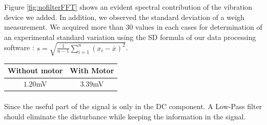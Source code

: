 \documentclass{article}[12pt]
\begin{document}
Figure \ref{fig:nofilterFFT} shows an evident spectral contribution of the vibration device we added. In addition, we observed the standard deviation of a weigh measurement. We acquired more than 30 values in each cases for determination of an experimental standard variation using the SD formula of our data processing software : $s = \sqrt{\frac{1}{n-1} \sum_{i=1}^n (x_i - \overline{x})^2}$. \\
\begin{center}
\begin{tabular}{|c|c|}
    \hline
    Without motor & With Motor \\
    \hline
     $1.20$mV & $3.39$mV \\
    \hline
\end{tabular}
\end{center}
\paragraph{}
Since the useful part of the signal is only in the DC component. A Low-Pass filter should eliminate the disturbance while keeping the information in the signal.
\end{document}
